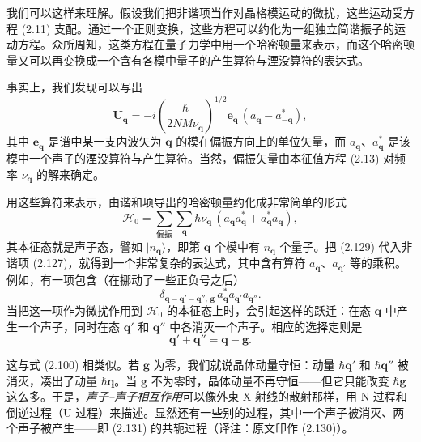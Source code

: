 我们可以这样来理解。假设我们把非谐项当作对晶格模运动的微扰，这些运动受方程 (2.11) 支配。通过一个正则变换，这些方程可以约化为一组独立简谐振子的运动方程。众所周知，这类方程在量子力学中用一个哈密顿量来表示，而这个哈密顿量又可以再变换成一个含有各模中量子的产生算符与湮没算符的表达式。

事实上，我们发现可以写出
\begin{equation*}
\mathbf{U}_{\mathbf{q}}=-i\left(\frac{\hbar}{2NM\nu_{\mathbf{q}}}\right)^{1/2}\mathbf{e}_{\mathbf{q}}\,(a_{\mathbf{q}}-a^{*}_{-\mathbf{q}}),
\tag{2.129}
\end{equation*}
其中 $\mathbf{e}_{\mathbf{q}}$ 是谱中某一支内波矢为 $\mathbf{q}$ 的模在偏振方向上的单位矢量，而 $a_{\mathbf{q}}$、$a^{*}_{\mathbf{q}}$ 是该模中一个声子的湮没算符与产生算符。当然，偏振矢量由本征值方程 (2.13) 对频率 $\nu_{\mathbf{q}}$ 的解来确定。

用这些算符来表示，由谐和项导出的哈密顿量约化成非常简单的形式
\begin{equation*}
\mathcal{H}_0=\sum_{\text{偏振}}\sum_{\mathbf{q}}\hbar\nu_{\mathbf{q}}\,(a_{\mathbf{q}}a^{*}_{\mathbf{q}}+a^{*}_{\mathbf{q}}a_{\mathbf{q}}),
\tag{2.130}
\end{equation*}
其本征态就是声子态，譬如 $|n_{\mathbf{q}}\rangle$，即第 $\mathbf{q}$ 个模中有 $n_{\mathbf{q}}$ 个量子。把 (2.129) 代入非谐项 (2.127)，就得到一个非常复杂的表达式，其中含有算符 $a_{\mathbf{q}}$、$a_{\mathbf{q}'}$ 等的乘积。例如，有一项包含（在挪动了一些正负号之后）
\begin{equation*}
\delta_{\mathbf{q}-\mathbf{q}'-\mathbf{q}'',\,\mathbf{g}}\,a^{*}_{\mathbf{q}}a_{\mathbf{q}'}a_{\mathbf{q}''}.
\tag{2.131}
\end{equation*}
当把这一项作为微扰作用到 $\mathcal{H}_0$ 的本征态上时，会引起这样的跃迁：在态 $\mathbf{q}$ 中产生一个声子，同时在态 $\mathbf{q}'$ 和 $\mathbf{q}''$ 中各消灭一个声子。相应的选择定则是
\begin{equation*}
\mathbf{q}'+\mathbf{q}''=\mathbf{q}-\mathbf{g}.
\tag{2.132}
\end{equation*}

这与式 (2.100) 相类似。若 $\mathbf{g}$ 为零，我们就说晶体动量守恒：动量 $\hbar\mathbf{q}'$ 和 $\hbar\mathbf{q}''$ 被消灭，凑出了动量 $\hbar\mathbf{q}$。当 $\mathbf{g}$ 不为零时，晶体动量不再守恒——但它只能改变 $\hbar\mathbf{g}$ 这么多。于是，\emph{声子–声子相互作用}可以像外束 X 射线的散射那样，用 N 过程和倒逆过程（U 过程）来描述。显然还有一些别的过程，其中一个声子被消灭、两个声子被产生——即 (2.131) 的共轭过程（译注：原文印作 (2.130)）。

